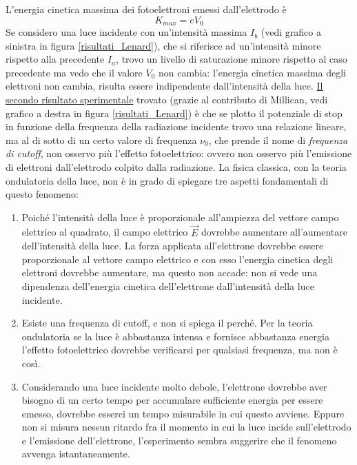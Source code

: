 L'energia cinetica massima dei fotoelettroni emessi dall'elettrodo è
\begin{equation}
K_{max} = e V_0
\end{equation}
Se considero una luce incidente con un'intensità massima $I_b$ (vedi grafico a sinistra in figura \ref{risultati_Lenard}), che si riferisce ad un'intensità minore rispetto alla precedente $I_a$, trovo un livello di saturazione minore rispetto al caso precedente ma vedo che il valore $V_0$ non cambia: l'energia cinetica massima degli elettroni non cambia, risulta essere indipendente dall'intensità della luce.
\underline{Il secondo risultato sperimentale} trovato (grazie al contributo di Millican, vedi grafico a destra in figura \ref{risultati_Lenard}) è che se plotto il potenziale di stop in funzione della frequenza della radiazione incidente trovo una relazione lineare, ma al di sotto di un certo valore di frequenza $\nu_0$, che prende il nome di \textit{frequenza di cutoff}, non osservo più l'effetto fotoelettrico: ovvero non osservo più l'emissione di elettroni dall'elettrodo colpito dalla radiazione.
La fisica classica, con la teoria ondulatoria della luce, non è in grado di spiegare tre aspetti fondamentali di questo fenomeno:
\begin{enumerate}[label=\Roman{*}]
\item Poiché l'intensità della luce è proporzionale all'ampiezza del vettore campo elettrico al quadrato, il campo elettrico $\vec E$ dovrebbe aumentare all'aumentare dell'intensità della luce.
La forza applicata all'elettrone dovrebbe essere proporzionale al vettore campo elettrico e con esso l'energia cinetica degli elettroni dovrebbe aumentare, ma questo non accade: non si vede una dipendenza dell'energia cinetica dell'elettrone dall'intensità della luce incidente.
\item Esiste una frequenza di cutoff, e non si spiega il perché. Per la teoria ondulatoria se la luce è abbastanza intensa e fornisce abbastanza energia l'effetto fotoelettrico dovrebbe verificarsi per qualsiasi frequenza, ma non è così. 
\item Considerando una luce incidente molto debole, l'elettrone dovrebbe aver bisogno di un certo tempo per accumulare sufficiente energia per essere emesso, dovrebbe esserci un tempo misurabile in cui questo avviene.
Eppure non si misura nessun ritardo fra il momento in cui la luce incide sull'elettrodo e l'emissione dell'elettrone, l'esperimento sembra suggerire che il fenomeno avvenga istantaneamente.
\end{enumerate}

